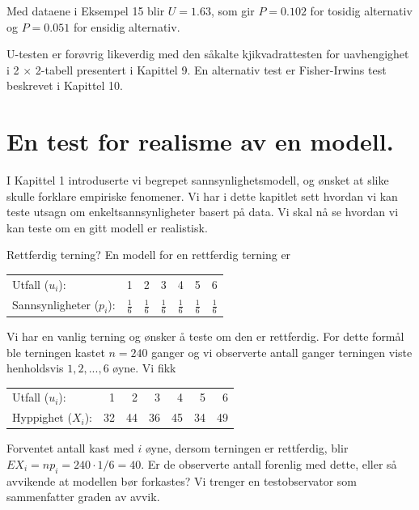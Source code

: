 Med dataene i Eksempel 15 blir $U=1.63$, som gir $P=0.102$ for tosidig
alternativ og $P=0.051$ for ensidig alternativ.

U-testen er forøvrig likeverdig med den såkalte
kjikvadrattesten for uavhengighet i 2 $\times$ 2-tabell presentert i
Kapittel 9. En alternativ test er Fisher-Irwins test beskrevet i Kapittel 10.


\section{En test for realisme av en modell.}

I Kapittel 1 introduserte vi begrepet sannsynlighetsmodell, og ønsket at
slike skulle forklare empiriske fenomener. Vi har i dette kapitlet sett 
hvordan vi kan teste utsagn om enkeltsannsynligheter basert på data.
Vi skal nå se hvordan vi kan teste om en gitt modell er realistisk.\\


\begin{eksempel}{Rettferdig terning?}
En modell for en rettferdig terning er
\begin{center}
\begin{tabular}{lrrrrrr}
Utfall ($u_i$):   & 1 & 2 & 3 & 4 & 5 & 6 \\
Sannsynligheter ($p_i$):&$\frac{1}{6}$&$\frac{1}{6}$&$\frac{1}{6}$
                        &$\frac{1}{6}$&$\frac{1}{6}$&$\frac{1}{6}$
\end{tabular}
\end{center}
Vi har en vanlig terning og ønsker å teste om den er rettferdig.
For dette formål ble terningen kastet $n=240$ ganger og vi
observerte antall ganger terningen viste henholdsvis $1,2,...,6$
øyne. Vi fikk
\begin{center}
\begin{tabular}{lrrrrrr}
Utfall ($u_i$):   & 1 & 2 & 3 & 4 & 5 & 6 \\
Hyppighet ($X_i$):&32 &44 &36 &45 &34 &49
\end{tabular}
\end{center}
Forventet antall kast med $i$ øyne, dersom terningen er rettferdig,
blir $EX_i=np_i=240\cdot 1/6=40$. Er de observerte antall forenlig med dette,
eller så avvikende at modellen bør forkastes?
Vi trenger en testobservator som sammenfatter graden av avvik.
\end{eksempel}


